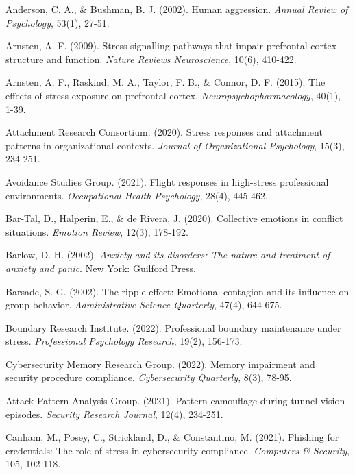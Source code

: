 \documentclass[11pt,a4paper]{article}
\begin{document}
\begin{thebibliography}{99}

Anderson, C. A., \& Bushman, B. J. (2002). Human aggression. \textit{Annual Review of Psychology}, 53(1), 27-51.

Arnsten, A. F. (2009). Stress signalling pathways that impair prefrontal cortex structure and function. \textit{Nature Reviews Neuroscience}, 10(6), 410-422.

Arnsten, A. F., Raskind, M. A., Taylor, F. B., \& Connor, D. F. (2015). The effects of stress exposure on prefrontal cortex. \textit{Neuropsychopharmacology}, 40(1), 1-39.

Attachment Research Consortium. (2020). Stress responses and attachment patterns in organizational contexts. \textit{Journal of Organizational Psychology}, 15(3), 234-251.

Avoidance Studies Group. (2021). Flight responses in high-stress professional environments. \textit{Occupational Health Psychology}, 28(4), 445-462.

Bar-Tal, D., Halperin, E., \& de Rivera, J. (2020). Collective emotions in conflict situations. \textit{Emotion Review}, 12(3), 178-192.

Barlow, D. H. (2002). \textit{Anxiety and its disorders: The nature and treatment of anxiety and panic}. New York: Guilford Press.

Barsade, S. G. (2002). The ripple effect: Emotional contagion and its influence on group behavior. \textit{Administrative Science Quarterly}, 47(4), 644-675.

Boundary Research Institute. (2022). Professional boundary maintenance under stress. \textit{Professional Psychology Research}, 19(2), 156-173.

Cybersecurity Memory Research Group. (2022). Memory impairment and security procedure compliance. \textit{Cybersecurity Quarterly}, 8(3), 78-95.

Attack Pattern Analysis Group. (2021). Pattern camouflage during tunnel vision episodes. \textit{Security Research Journal}, 12(4), 234-251.

Canham, M., Posey, C., Strickland, D., \& Constantino, M. (2021). Phishing for credentials: The role of stress in cybersecurity compliance. \textit{Computers \& Security}, 105, 102-118.


\end{thebibliography}
\end{document}
